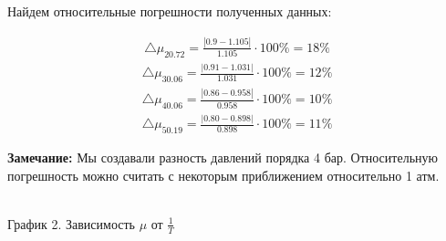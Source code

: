 \documentclass[a4paper, 12pt]{article}
\begin{document}
	Найдем относительные погрешности полученных данных:
	
	\begin{equation}
		\begin{aligned}
			\bigtriangleup \mu_{20.72} = \frac{|0.9 - 1.105|}{1.105} \cdot 100\% = 18\%
		\end{aligned}
	\end{equation}
	\begin{equation}
	\begin{aligned}
		\bigtriangleup \mu_{30.06} = \frac{|0.91 - 1.031|}{1.031} \cdot 100\% = 12\%
	\end{aligned}
\end{equation}
	\begin{equation}
	\begin{aligned}
		\bigtriangleup \mu_{40.06} = \frac{|0.86 - 0.958|}{0.958} \cdot 100\% = 10\%
	\end{aligned}
\end{equation}
	\begin{equation}
	\begin{aligned}
		\bigtriangleup \mu_{50.19} = \frac{|0.80 - 0.898|}{0.898} \cdot 100\% = 11\%
	\end{aligned}
\end{equation}

\noindent\textbf{Замечание:} Мы создавали разность давлений порядка 4 бар. Относительную погрешность можно считать с некоторым приближением относительно 1 атм.

\begin{center}
			\\
	График 2. Зависимость $\mu$ от $\frac{1}{T}$  
\end{center}
\end{document}
